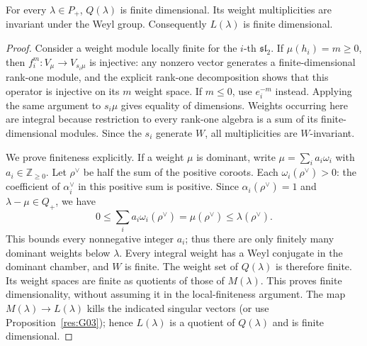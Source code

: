 \begin{theorem}
\label{res:G05}
For every \(\lambda\in P_+\), \(Q(\lambda)\) is finite dimensional.
Its weight multiplicities are invariant under the Weyl group.
Consequently \(L(\lambda)\) is finite dimensional.
\end{theorem}
\begin{proof}
Consider a weight module locally finite for the \(i\)-th
\(\mathfrak{sl}_2\). If \(\mu(h_i)=m\geq0\), then
\(f_i^m:V_\mu\to V_{s_i\mu}\) is injective: any nonzero vector
generates a finite-dimensional rank-one module, and the explicit
rank-one decomposition shows that this operator is injective on
its \(m\) weight space. If \(m\leq0\), use \(e_i^{-m}\) instead.
Applying the same argument to \(s_i\mu\) gives equality of
dimensions. Weights occurring here are integral because restriction
to every rank-one algebra is a sum of its finite-dimensional modules.
Since the \(s_i\) generate \(W\), all multiplicities are
\(W\)-invariant.

We prove finiteness explicitly. If a weight \(\mu\) is dominant,
write \(\mu=\sum_i a_i\omega_i\) with \(a_i\in\mathbb Z_{\geq0}\).
Let \(\rho^\vee\) be half the sum of the positive coroots. Each
\(\omega_i(\rho^\vee)>0\): the coefficient of \(\alpha_i^\vee\)
in this positive sum is positive. Since
\(\alpha_i(\rho^\vee)=1\) and \(\lambda-\mu\in Q_+\), we have
\[
 0\leq\sum_i a_i\omega_i(\rho^\vee)
      =\mu(\rho^\vee)\leq\lambda(\rho^\vee).
\]
This bounds every nonnegative integer \(a_i\); thus there are only
finitely many dominant weights below \(\lambda\).
Every integral weight has a Weyl conjugate in the dominant chamber,
and \(W\) is finite. The weight set of \(Q(\lambda)\) is therefore
finite. Its weight spaces are finite as quotients of those of
\(M(\lambda)\). This proves finite dimensionality, without assuming
it in the local-finiteness argument.
The map \(M(\lambda)\to L(\lambda)\) kills the indicated singular
vectors (or use Proposition~\ref{res:G03}); hence \(L(\lambda)\)
is a quotient of \(Q(\lambda)\) and is finite dimensional.
\end{proof}

